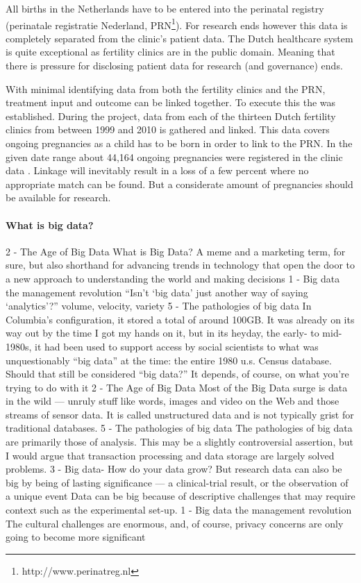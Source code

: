All births in the Netherlands have to be entered into the perinatal registry (perinatale registratie Nederland, PRN\footnote{http://www.perinatreg.nl}).
For research ends however this data is completely separated from the clinic's patient data.
The Dutch healthcare system is quite exceptional as fertility clinics are in the public domain.
Meaning that there is pressure for disclosing patient data for research (and governance) ends.

With minimal identifying data from both the fertility clinics and the PRN, treatment input and outcome can be linked together.
To execute this the \project{} was established.
During the project, data from each of the thirteen Dutch fertility clinics from between 1999 and 2010 is gathered and linked.
This data covers ongoing pregnancies as a child has to be born in order to link to the PRN.
In the given date range about 44,164 ongoing pregnancies were registered in the clinic data \cite{ivfReportNVOG}.
Linkage will inevitably result in a loss of a few percent where no appropriate match can be found.
But a considerate amount of pregnancies should be available for research.

\paragraph{What is big data?}
2 - The Age of Big Data
What is Big Data? A meme and a marketing term, for sure, but also shorthand for advancing trends in technology that open the door to a new approach to understanding the world and making decisions
1 - Big data the management revolution
``Isn't `big data' just another way of saying `analytics'?'' volume, velocity, variety
5 - The pathologies of big data
In Columbia's configuration, it stored a total of around 100GB. It was already on its way out by the time I got my hands on it, but in its heyday, the early- to mid- 1980s, it had been used to support access by social scientists to what was unquestionably “big data” at the time: the entire 1980 u.s. Census database.
Should that still be considered “big data?” It depends, of course, on what you're trying to do with it
2 - The Age of Big Data
Most of the Big Data surge is data in the wild — unruly stuff like words, images and video on the Web and those streams of sensor data. It is called unstructured data and is not typically grist for traditional databases.
5 - The pathologies of big data
The pathologies of big data are primarily those of analysis. This may be a slightly controversial assertion, but I would argue that transaction processing and data storage are largely solved problems.
3 - Big data- How do your data grow?
But research data can also be big by being of lasting significance — a clinical-trial result, or the observation of a unique event
Data can be big because of descriptive challenges that may require context such as the experimental set-up.
1 - Big data the management revolution
The cultural challenges are enormous, and, of course, privacy concerns are only going to become more significant

